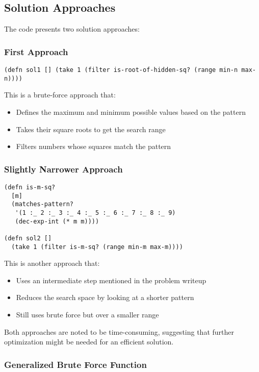 \subsection{Solution Approaches}

The code presents two solution approaches:

\subsubsection{First Approach}
\begin{lstlisting}
(defn sol1 [] (take 1 (filter is-root-of-hidden-sq? (range min-n max-n))))
\end{lstlisting}

This is a brute-force approach that:
\begin{itemize}
    \item Defines the maximum and minimum possible values based on the pattern
    \item Takes their square roots to get the search range
    \item Filters numbers whose squares match the pattern
\end{itemize}

\subsubsection{Slightly Narrower Approach}
\begin{lstlisting}
(defn is-m-sq?
  [m]
  (matches-pattern?
   '(1 :_ 2 :_ 3 :_ 4 :_ 5 :_ 6 :_ 7 :_ 8 :_ 9)
   (dec-exp-int (* m m))))

(defn sol2 [] 
  (take 1 (filter is-m-sq? (range min-m max-m))))
\end{lstlisting}

This is another approach that:
\begin{itemize}
    \item Uses an intermediate step mentioned in the problem writeup
    \item Reduces the search space by looking at a shorter pattern
    \item Still uses brute force but over a smaller range
\end{itemize}

Both approaches are noted to be time-consuming, suggesting that further optimization might be needed for an efficient solution.


\subsubsection{Generalized Brute Force Function}

